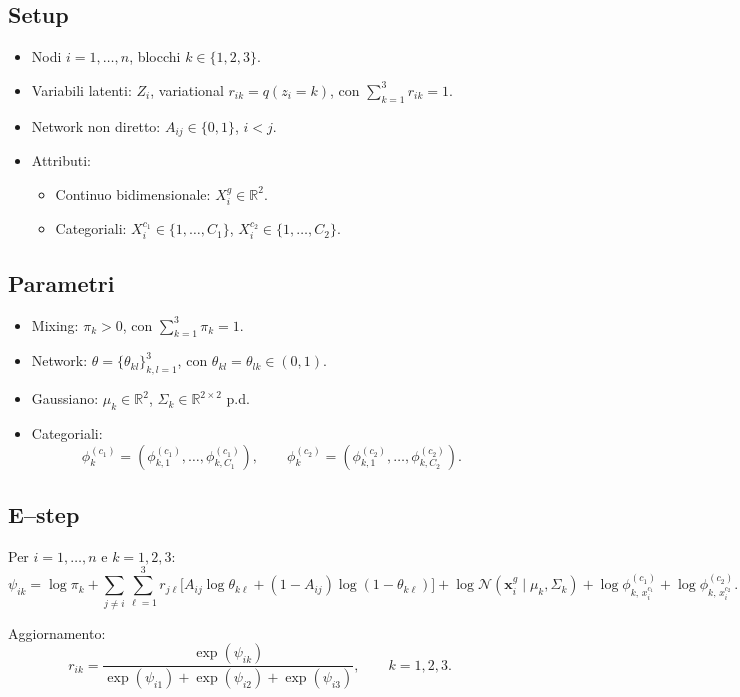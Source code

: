 \documentclass[11pt,a4paper]{article}
\begin{document}
\subsection*{Setup}
\begin{itemize}
  \item Nodi $i=1,\dots,n$, blocchi $k \in \{1,2,3\}$.
  \item Variabili latenti: $Z_i$, variational $r_{ik}=q(z_i=k)$, con $\sum_{k=1}^3 r_{ik}=1$.
  \item Network non diretto: $A_{ij}\in\{0,1\}$, $i<j$.
  \item Attributi:
    \begin{itemize}
      \item Continuo bidimensionale: $X_i^{g} \in \mathbb{R}^2$.
      \item Categoriali: $X_i^{c_1} \in \{1,\dots,C_1\}$, $X_i^{c_2} \in \{1,\dots,C_2\}$.
    \end{itemize}
\end{itemize}

\subsection*{Parametri}
\begin{itemize}
  \item Mixing: $\pi_k > 0$, con $\sum_{k=1}^3 \pi_k = 1$.
  \item Network: $\theta = \{\theta_{kl}\}_{k,l=1}^3$, con $\theta_{kl}=\theta_{lk}\in(0,1)$.
  \item Gaussiano: $\mu_k \in \mathbb{R}^2$, $\Sigma_k \in \mathbb{R}^{2\times 2}$ p.d.
  \item Categoriali: 
    \[
      \phi_k^{(c_1)} = (\phi^{(c_1)}_{k,1},\dots,\phi^{(c_1)}_{k,C_1}),\qquad
      \phi_k^{(c_2)} = (\phi^{(c_2)}_{k,1},\dots,\phi^{(c_2)}_{k,C_2}).
    \]
\end{itemize}

\subsection*{E--step}

Per $i=1,\dots,n$ e $k=1,2,3$:
\[
\psi_{ik} =
\log \pi_k
+ \sum_{j \ne i}\sum_{\ell=1}^3 r_{j\ell}\Big[
A_{ij}\log \theta_{k\ell} + (1-A_{ij})\log(1-\theta_{k\ell})
\Big]
+\log \mathcal{N}(\mathbf{x}_i^{g} \mid \mu_k,\Sigma_k)
+\log \phi^{(c_1)}_{k,\,x_i^{c_1}}
+\log \phi^{(c_2)}_{k,\,x_i^{c_2}}.
\]

Aggiornamento:
\[
r_{ik} = \frac{\exp(\psi_{ik})}{\exp(\psi_{i1})+\exp(\psi_{i2})+\exp(\psi_{i3})},
\qquad k=1,2,3.
\]
\end{document}
